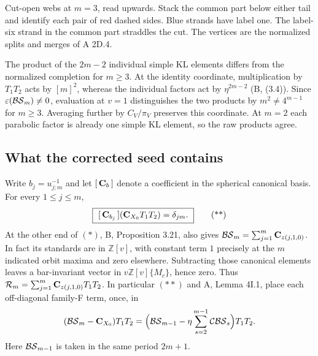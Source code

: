 \begin{center}

\end{center}
{\small Cut-open webs at $m=3$, read upwards. Stack the common part below either tail and identify each pair of red dashed sides. Blue strands have label one. The label-six strand in the common part straddles the cut. The vertices are the normalized splits and merges of A 2D.4.}\par

\noindent The product of the $2m-2$ individual simple KL elements
differs from the normalized completion for $m\ge3$.
At the identity coordinate, multiplication by $T_1T_2$ acts
by $[m]^2$, whereas the individual factors act by $\eta^{2m-2}$
(B, (3.4)). Since $\varepsilon(\mathcal{BS}_m)\ne0$, evaluation at $v=1$ distinguishes
the two products by $m^2\ne4^{m-1}$ for $m\ge3$. Averaging further by
$C_V/\pi_V$ preserves this coordinate. At $m=2$ each parabolic
factor is already one simple KL element, so the raw products agree.



\clearpage
\subsection{What the corrected seed contains}

Write $b_j=u_{j;m}^{-1}$ and let $[\,\mathbf C_b\,]$ denote a coefficient
in the spherical canonical basis. For every $1\le j\le m$,
\[
 \boxed{\ [\,\C_{b_j}\,](\C_{X_0}T_1T_2)=\delta_{jm}.\ }          \tag{**}
\]
At the other end of $(*)$, B, Proposition 3.21, also gives
$\mathcal{BS}_m=\sum_{j=1}^m\mathbf C_{z(j,1,0)}$. In fact its standards are in
$\mathbb Z[v]$, with constant term $1$ precisely at the $m$ indicated
orbit maxima and zero elsewhere. Subtracting those canonical elements
leaves a bar-invariant vector in $v\mathbb Z[v]\{M_c\}$, hence zero.
Thus $\mathcal R_m=\sum_{j=1}^m\mathbf C_{z(j,1,0)}T_1T_2$. In particular $(**)$
and A, Lemma 4I.1, place each off-diagonal family-F term, once, in
\[
 (\mathcal{BS}_m-\mathbf C_{X_0})T_1T_2
 =\Big(\mathcal{BS}_{m-1}-\eta\sum_{s=2}^{m-1}\mathcal{CBS}_s\Big)T_1T_2.
\]
Here $\mathcal{BS}_{m-1}$ is taken in the same period $2m+1$.

